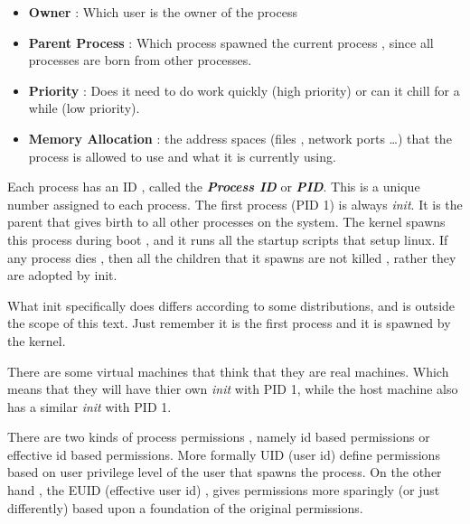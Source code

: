 
\begin{itemize}[noitemsep]

	\item \textbf{Owner} : Which user is the owner of the process 

	\item \textbf{Parent Process} : Which process spawned the current process ,
		since all processes are born from other processes.

	\item \textbf{Priority} : Does it need to do work quickly (high priority) or
		can it chill for a while (low priority).

	\item \textbf{Memory Allocation} : the address spaces (files , network ports
		\ldots) that the process is allowed to use and what it is currently
		using.

\end{itemize}


Each process has an ID , called the \textbf{\textit{Process ID}} or
\textbf{\textit{PID}}. This is a unique number assigned to each process. The
first process (PID 1) is always \textit{init}. It is the parent that gives birth
to all other processes on the system. The kernel spawns this process during boot
, and it runs all the startup scripts that setup linux. If any process dies ,
then all the children that it spawns are not killed , rather they are adopted by
init.

What init specifically does differs according to some distributions, and is
outside the scope of this text. Just remember it is the first process and it is
spawned by the kernel.


\tcolorboxnote
{

There are some virtual machines that think that they are real machines. Which
means that they will have thier own \textit{init} with PID 1, while the host
machine also has a similar \textit{init} with PID 1.

} 


There are two kinds of process permissions , namely id based permissions or
effective id based permissions. More formally UID (user id) define permissions
based on user privilege level of the user that spawns the process.  On the other
hand , the EUID (effective user id) , gives permissions more sparingly (or just
differently) based upon a foundation of the original permissions.

